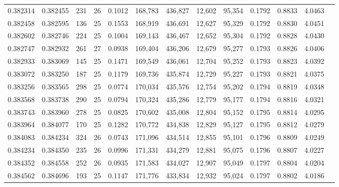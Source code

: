 \begin{tabular}{rrrrrrrrrrrrr}
0.382314 & 0.382455 & 231 &  26 &                                     0.1012 & 168,783 & 436,827 &  12,602 &  95,354 & 0.1792 & 0.8833 & 4.0463 \\
0.382458 & 0.382595 & 136 &  25 &                                     0.1553 & 168,919 & 436,691 &  12,627 &  95,329 & 0.1792 & 0.8830 & 4.0451 \\
0.382602 & 0.382746 & 224 &  25 &                                     0.1004 & 169,143 & 436,467 &  12,652 &  95,304 & 0.1792 & 0.8828 & 4.0430 \\
0.382747 & 0.382932 & 261 &  27 &                                     0.0938 & 169,404 & 436,206 &  12,679 &  95,277 & 0.1793 & 0.8826 & 4.0406 \\
0.382933 & 0.383069 & 145 &  25 &                                     0.1471 & 169,549 & 436,061 &  12,704 &  95,252 & 0.1793 & 0.8823 & 4.0392 \\
0.383072 & 0.383250 & 187 &  25 &                                     0.1179 & 169,736 & 435,874 &  12,729 &  95,227 & 0.1793 & 0.8821 & 4.0375 \\
0.383256 & 0.383565 & 298 &  25 &                                     0.0774 & 170,034 & 435,576 &  12,754 &  95,202 & 0.1794 & 0.8819 & 4.0348 \\
0.383568 & 0.383738 & 290 &  25 &                                     0.0794 & 170,324 & 435,286 &  12,779 &  95,177 & 0.1794 & 0.8816 & 4.0321 \\
0.383743 & 0.383960 & 278 &  25 &                                     0.0825 & 170,602 & 435,008 &  12,804 &  95,152 & 0.1795 & 0.8814 & 4.0295 \\
0.383964 & 0.384077 & 170 &  25 &                                     0.1282 & 170,772 & 434,838 &  12,829 &  95,127 & 0.1795 & 0.8812 & 4.0279 \\
0.384083 & 0.384234 & 324 &  26 &                                     0.0743 & 171,096 & 434,514 &  12,855 &  95,101 & 0.1796 & 0.8809 & 4.0249 \\
0.384234 & 0.384350 & 235 &  26 &                                     0.0996 & 171,331 & 434,279 &  12,881 &  95,075 & 0.1796 & 0.8807 & 4.0227 \\
0.384352 & 0.384558 & 252 &  26 &                                     0.0935 & 171,583 & 434,027 &  12,907 &  95,049 & 0.1797 & 0.8804 & 4.0204 \\
0.384562 & 0.384696 & 193 &  25 &                                     0.1147 & 171,776 & 433,834 &  12,932 &  95,024 & 0.1797 & 0.8802 & 4.0186 \\

\end{tabular}
